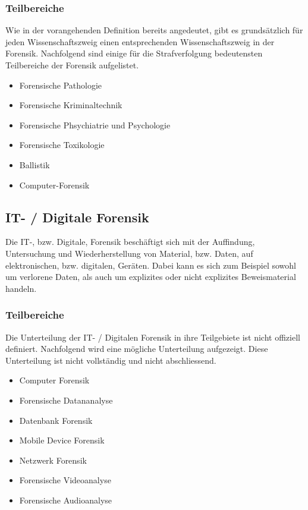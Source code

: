 \subsubsection{Teilbereiche}
Wie in der vorangehenden Definition bereits angedeutet, gibt es grundsätzlich für jeden Wissenschaftszweig einen entsprechenden Wissenschaftszweig in der Forensik. Nachfolgend sind einige für die Strafverfolgung bedeutensten Teilbereiche der Forensik aufgelistet.

\begin{itemize}
\item Forensische Pathologie
\item Forensische Kriminaltechnik
\item Forensische Phsychiatrie und Psychologie
\item Forensische Toxikologie
\item Ballistik
\item Computer-Forensik
\end{itemize}


\subsection{IT- / Digitale Forensik}
Die IT-, bzw. Digitale, Forensik beschäftigt sich mit der Auffindung, Untersuchung und Wiederherstellung von Material, bzw. Daten, auf elektronischen, bzw. digitalen, Geräten. Dabei kann es sich zum Beispiel sowohl um verlorene Daten, als auch um explizites oder nicht explizites Beweismaterial handeln.

\subsubsection{Teilbereiche}
Die Unterteilung der IT- / Digitalen Forensik in ihre Teilgebiete ist nicht offiziell definiert. Nachfolgend wird eine mögliche Unterteilung aufgezeigt. Diese Unterteilung ist nicht vollständig und nicht abschliessend.

\begin{itemize}
\item Computer Forensik
\item Forensische Datananalyse
\item Datenbank Forensik
\item Mobile Device Forensik
\item Netzwerk Forensik
\item Forensische Videoanalyse
\item Forensische Audioanalyse

\end{itemize}


